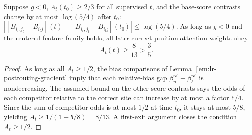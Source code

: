 \begin{lrlemma}
\label{lem:lr-post-routing}
Suppose $g<0$, $A_t(t_0)\ge2/3$ for all supervised $t$, and the
base-score contrasts change by at most $\log(5/4)$ after $t_0$:
 $|[B_{i_t,j_t}-B_{i_tj}](t)-[B_{i_t,j_t}-B_{i_tj}](t_0)| \le\log(5/4).$ 
As long as $g<0$ and the centered-feature family holds, all later
correct-position attention weights obey
\begin{equation}\label{eq:lr-post-floor}
 A_t(t)\ge\frac8{13}>\frac35.
\end{equation}
\end{lrlemma}
\begin{proof}
As long as all $A_t\ge1/2$, the bias comparisons of
Lemma~\ref{lem:lr-postrouting-gradient} imply that each relative-bias
gap $\beta_n^{\mathrm{rel}}-\beta_\ell^{\mathrm{rel}}$ is
nondecreasing.  The assumed bound on the other score contrasts says
the odds of each competitor relative to the correct site can increase
by at most a factor $5/4$.  Since the sum of competitor odds is at most
$1/2$ at time $t_0$, it stays at most $5/8$, yielding
$A_t\ge1/(1+5/8)=8/13$.  A first-exit argument closes the condition
$A_t\ge1/2$.
\end{proof}

